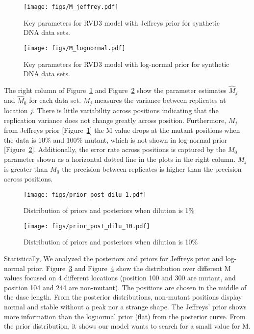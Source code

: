 \documentclass[11pt,reqno]{amsart}
\begin{document}
\begin{figure}[htbp]
\begin{center}
\texttt{[image: figs/M\_jeffrey.pdf]}
\caption{Key parameters for RVD3 model with Jeffreys prior for synthetic DNA data sets.}
\label{fig:M_jeffrey}
\end{center}
\end{figure}

\begin{figure}[htbp]
\begin{center}
\texttt{[image: figs/M\_lognormal.pdf]}
\caption{Key parameters for RVD3 model with log-normal prior for synthetic DNA data sets.}
\label{fig:M_lognormal}
\end{center}
\end{figure}

The right column of Figure~\ref{fig:M_jeffrey} and Figure~\ref{fig:M_lognormal} show the parameter estimates $\hat{M}_j$ and $\hat{M}_0$ for each data set. $M_j$ measures the variance between replicates at location $j$. There is little variability across positions indicating that the replication variance does not change greatly across position. Furthermore, $M_j$ from Jeffreys prior [Figure~\ref{fig:M_jeffrey}] the M value drops at the mutant positions when the data is 10\% and 100\% mutant, which is not shown in log-normal prior [Figure~\ref{fig:M_lognormal}]. Additionally, the error rate across positions is captured by the $M_0$ parameter shown as a horizontal dotted line in the plots in the right column. $M_j$ is greater than $M_0$ the precision between replicates is higher than the precision across positions.


\begin{figure}[htbp]
\begin{center}
\texttt{[image: figs/prior\_post\_dilu\_1.pdf]}
\caption{Distribution of priors and posteriors when dilution is 1\%}
\label{fig:dilu_1}
\end{center}
\end{figure}

\begin{figure}[htbp]
\begin{center}
\texttt{[image: figs/prior\_post\_dilu\_10.pdf]}
\caption{Distribution of priors and posteriors when dilution is 10\%}
\label{fig:dilu_10}
\end{center}
\end{figure}

Statistically, We analyzed the posteriors and priors for Jeffreys prior and log-normal prior. Figure~\ref{fig:dilu_1} and Figure~\ref{fig:dilu_10} show the distribution over different M values focused on 4 different locations (position 100 and 300 are mutant, and position 104 and 244 are non-mutant). The positions are chosen in the middle of the dase length. From the posterior distributions, non-mutant positions display normal and stable without a peak nor a strange shape. The Jeffreys' prior shows more information than the lognormal prior (flat) from the posterior curve. From the prior distribution, it shows our model wants to search for a small value for M.
\end{document}
